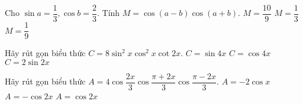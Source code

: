 \begin{ex}%
	Cho $\sin a=\dfrac{1}{3}, \cos b=\dfrac{2}{3}$. Tính $M=\cos(a-b)\cos(a+b)$.
	{$M=\dfrac{10}{9}$}
	{\True $M=\dfrac{1}{3}$}
	{$M=\dfrac{1}{9}$}
\end{ex}
\begin{ex}%
	Hãy rút gọn biểu thức $C=8\sin^2x\cos^2x\cot2x$.
	{\True $C=\sin4x$}
	{$C=\cos4x$}
	{$C=2\sin2x$}
\end{ex}
\begin{ex}%
	Hãy rút gọn biểu thức $A=4\cos\dfrac{2x}{3}\cos\dfrac{\pi+2x}{3}\cos\dfrac{\pi-2x}{3}$.
	{$A=-2\cos x$}
	{$A=-\cos2x$}
	{\True $A=\cos2x$}
\end{ex}


